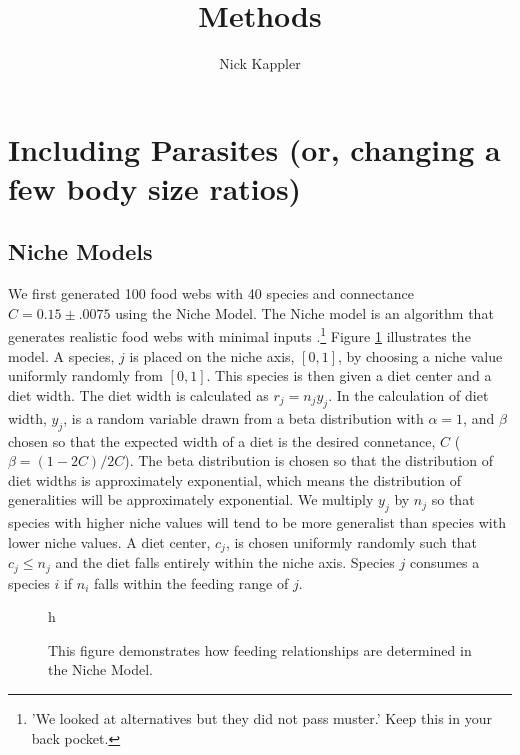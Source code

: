 \documentclass[11pt]{amsart}
\title{Methods}
\author{Nick Kappler}
\begin{document}
\maketitle
\section{Including Parasites (or, changing a few body size ratios)}


\subsection{Niche Models\label{sec:structure}}

We first generated 100 food webs with 40 species and connectance $C=0.15\pm .0075$ using the Niche Model.  The Niche model is an algorithm that generates realistic food webs with minimal inputs \cite{Williams2001,Another?}.\footnote{'We looked at alternatives but they did not pass muster.' Keep this in your back pocket.}  Figure \ref{fig:nicheModel} illustrates the model.  A species, $j$ is placed on the niche axis, $[0,1]$, by choosing a niche value uniformly randomly from $[0,1]$.  This species is then given a diet center and a diet width.  The diet width is calculated as $r_j=n_jy_j$.  In the calculation of diet width, $y_j$, is a random variable drawn from a beta distribution with $\alpha = 1$, and $\beta$ chosen so that the expected width of a diet is the desired connetance, $C$ ($\beta = (1-2C)/2C$).  The beta distribution is chosen so that the distribution of diet widths is approximately exponential, which means the distribution of generalities will be approximately exponential.  We multiply $y_j$ by $n_j$ so that species with higher niche values will tend to be more generalist than species with lower niche values.  A diet center, $c_j$, is chosen uniformly randomly such that $c_j \leq n_j$ and the diet falls entirely within the niche axis.  Species $j$ consumes a species $i$ if $n_i$ falls within the feeding range of $j$.  


\begin{figure}{h}
\caption{This figure demonstrates how feeding relationships are determined in the Niche Model.\label{fig:nicheModel}}
\end{figure}
\end{document}
